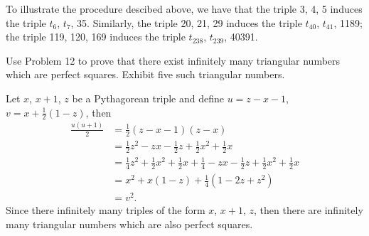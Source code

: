 \begin{solution}
\begin{enumerate}
        To illustrate the procedure descibed above, we have that the triple 3, 4, 5 induces the triple $t_6$, $t_7$, 35. Similarly, the triple 20, 21, 29 induces the triple $t_{40}$, $t_{41}$, 1189; the triple 119, 120, 169 induces the triple $t_{238}$, $t_{239}$, 40391. \\
    \end{enumerate}
\end{solution}

\begin{exercise}
    Use Problem 12 to prove that there exist infinitely many triangular numbers which are perfect squares. Exhibit five such triangular numbers.  \\
\end{exercise}

\begin{solution}
     Let $x$, $x + 1$, $z$ be a Pythagorean triple and define $u = z - x - 1$, $v = x + \frac{1}{2}(1-z)$, then
    \begin{align*}
        \frac{u(u+1)}{2} &= \frac{1}{2}(z - x - 1)(z - x) \\
        &= \frac{1}{2}z^2 - zx - \frac{1}{2}z + \frac{1}{2}x^2 + \frac{1}{2}x \\
        &= \frac{1}{4}z^2 + \frac{1}{2}x^2 + \frac{1}{2}x + \frac{1}{4}- zx - \frac{1}{2}z + \frac{1}{2}x^2 + \frac{1}{2}x \\
        &= x^2 + x(1-z) + \frac{1}{4}(1 - 2z + z^2) \\
        &= v^2.
    \end{align*}
    Since there infinitely many triples of the form $x$, $x + 1$, $z$, then there are infinitely many triangular numbers which are also perfect squares.
\end{solution}